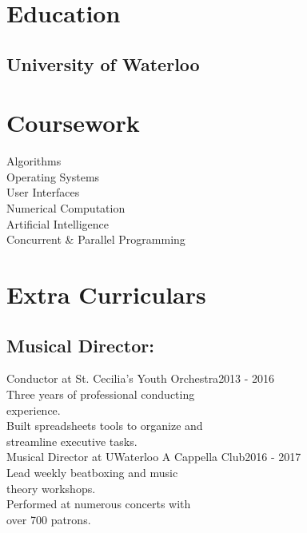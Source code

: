 \documentclass[letterpaper]{kevin-resume} %
\begin{document}
{\begin{minipage}[t]{0.30\textwidth}
\section{Education} 

\subsection{University of Waterloo}


\sectionspace %


\section{Coursework}

Algorithms \\
Operating Systems \\
User Interfaces \\
Numerical Computation \\
Artificial Intelligence \\
Concurrent \& Parallel Programming

\sectionspace %



\section{Extra Curriculars}
\subsection{Musical Director:}
{Conductor at St. Cecilia’s Youth Orchestra}\hspace{10mm}2013 - 2016\\
	\textbullet{} Three years of professional conducting\\
	\hspace{3mm}experience.\\
	\textbullet{} Built spreadsheets tools to organize and\\
	\hspace{3mm}streamline executive tasks.\\
{Musical Director at UWaterloo A Cappella Club}\hspace{5mm}2016 - 2017\\
	\textbullet{} Lead weekly beatboxing and music\\
	\hspace{3mm}theory workshops.\\
	\textbullet{} Performed at numerous concerts with\\
	\hspace{3mm}over 700 patrons.


\end{minipage}}
\end{document}
